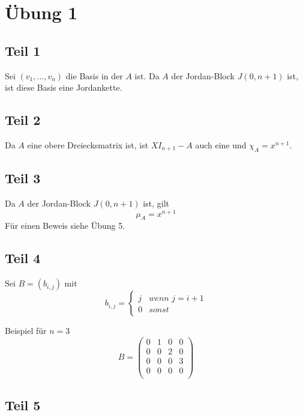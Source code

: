 \documentclass[10pt,a4paper]{article}
\begin{document}
\section*{Übung 1}

\subsection*{Teil 1}

Sei $(v_{1}, \dots, v_{n})$ die Basis in der $A$ ist.
Da $A$ der Jordan-Block $J(0, n + 1)$ ist, ist diese Basis eine Jordankette.

\subsection*{Teil 2}

Da $A$ eine obere Dreiecksmatrix ist, ist $XI_{n + 1} - A$ auch eine und $\chi_{A} = x^{n + 1}$.

\subsection*{Teil 3}

Da $A$ der Jordan-Block $J(0, n + 1)$ ist, gilt
\begin{equation}
\mu_{A} = x^{n + 1}
\end{equation}
Für einen Beweis siehe Übung 5.

\subsection*{Teil 4}

Sei $B = (b_{i,j})$ mit
\begin{equation}
b_{i,j} =
\begin{cases}
j & \textit{wenn $j = i + 1$}\\
0 & \textit{sonst}
\end{cases}
\end{equation}

Beispiel für $n = 3$
\begin{equation}
B = 
\begin{pmatrix}
0 & 1 & 0 & 0\\
0 & 0 & 2 & 0\\
0 & 0 & 0 & 3\\
0 & 0 & 0 & 0\\
\end{pmatrix}
\end{equation}

\subsection*{Teil 5}
\end{document}
